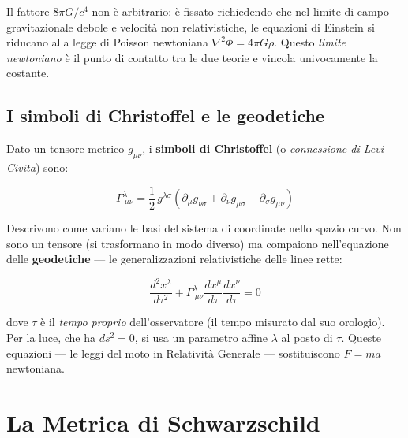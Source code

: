 \documentclass[12pt, a4paper, twoside]{article}
\newenvironment{curiosity}[1]{%
  \begin{tcolorbox}[curiositybox, title={Curiosit\`a: #1}]
}{%
  \end{tcolorbox}
}
\theoremstyle{definition}
\newcommand{\munu}{{\mu\nu}}
\newcommand{\gmunu}{g_{\munu}}
\begin{document}
\begin{curiosity}{Perché $8\pi$?}
  Il fattore $8\pi G/c^4$ non è arbitrario: è fissato richiedendo che nel
  limite di campo gravitazionale debole e velocità non relativistiche, le
  equazioni di Einstein si riducano alla legge di Poisson newtoniana
  $\nabla^2\Phi = 4\pi G\rho$. Questo \emph{limite newtoniano} è il punto di
  contatto tra le due teorie e vincola univocamente la costante.
\end{curiosity}

\subsection{I simboli di Christoffel e le geodetiche}

Dato un tensore metrico $\gmunu$, i \textbf{simboli di Christoffel} (o
\emph{connessione di Levi-Civita}) sono:

\begin{equation}
  \Gamma^\lambda_{\ \mu\nu}
  = \frac{1}{2}\, g^{\lambda\sigma}
    \left(\partial_\mu g_{\nu\sigma}
        + \partial_\nu g_{\mu\sigma}
        - \partial_\sigma g_{\mu\nu}\right)
  \label{eq:christoffel}
\end{equation}

Descrivono come variano le basi del sistema di coordinate nello spazio curvo.
Non sono un tensore (si trasformano in modo diverso) ma compaiono nell'equazione
delle \textbf{geodetiche} — le generalizzazioni relativistiche delle linee rette:

\begin{equation}
  \frac{d^2 x^\lambda}{d\tau^2}
  + \Gamma^\lambda_{\ \mu\nu}\frac{dx^\mu}{d\tau}\frac{dx^\nu}{d\tau} = 0
  \label{eq:geodetica}
\end{equation}

dove $\tau$ è il \emph{tempo proprio} dell'osservatore (il tempo misurato dal
suo orologio). Per la luce, che ha $ds^2 = 0$, si usa un parametro affine
$\lambda$ al posto di $\tau$. Queste equazioni — le leggi del moto in
Relatività Generale — sostituiscono $F = ma$ newtoniana.

\newpage

\section{La Metrica di Schwarzschild}
\end{document}
